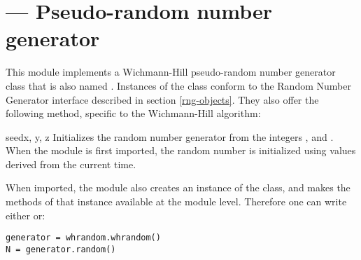 \section{ ---
         Pseudo-random number generator}



This module implements a Wichmann-Hill pseudo-random number generator
class that is also named .  Instances of the
 class conform to the Random Number Generator
interface described in section \ref{rng-objects}.  They also offer the 
following method, specific to the Wichmann-Hill algorithm:

\begin{funcdesc}{seed}{x, y, z}
  Initializes the random number generator from the integers ,
   and .  When the module is first imported, the random
  number is initialized using values derived from the current time.
\end{funcdesc}


When imported, the  module also creates an instance of
the  class, and makes the methods of that instance
available at the module level.  Therefore one can write either 
 or:
\begin{verbatim}
generator = whrandom.whrandom()
N = generator.random()
\end{verbatim}


\begin{seealso}
\end{seealso}
